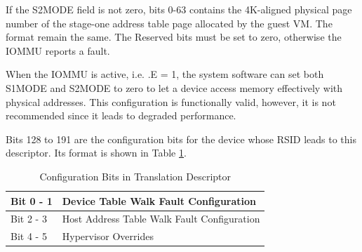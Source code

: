 If the S2MODE field is not zero, bits 0-63 contains the 4K-aligned physical page number of
the stage-one address table page allocated by the guest VM. The format remain the same.
The Reserved bits must be set to zero, otherwise the IOMMU reports a fault.



%
%

\note When the IOMMU is active, i.e. \iommucapen.E = 1, the system software can set both
S1MODE and S2MODE to zero to let a device access memory effectively with physical
addresses. This configuration is functionally valid, however, it is not recommended since
it leads to degraded performance. \noteend

Bits 128 to 191 are the configuration bits for the device whose RSID leads to this
descriptor. Its format is shown in Table \ref{tbl:desc_conf}.

\begin{table}[h!t]
    \centering
    \begin{tabular}{ | l | l | }

    \hline
    Bit 0 - 1  &  Device Table Walk Fault Configuration \\
    \hline
    Bit 2 - 3  &  Host Address Table Walk Fault Configuration \\
    \hline
    Bit 4 - 5  &  Hypervisor Overrides \\
    \hline

    \end{tabular}
    \caption{Configuration Bits in Translation Descriptor}
    \label{tbl:desc_conf}
\end{table}

